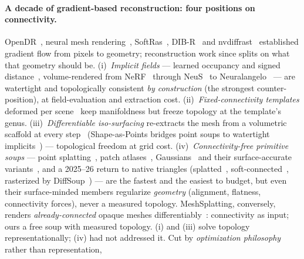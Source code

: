 \paragraph{A decade of gradient-based reconstruction: four positions on
connectivity.}
OpenDR~\citep{loper2014opendr}, neural mesh
rendering~\citep{kato2018neural}, SoftRas~\citep{liu2019softras},
DIB-R~\citep{chen2019dibr} and nvdiffrast~\citep{laine2020nvdiffrast}
established gradient flow from pixels to geometry; reconstruction work
since splits on what that geometry should be.
(i)~\emph{Implicit fields} --- learned occupancy and signed
distance~\citep{mescheder2019occupancy,park2019deepsdf}, volume-rendered
from NeRF~\citep{mildenhall2020nerf} through NeuS~\citep{wang2021neus} to
Neuralangelo~\citep{li2023neuralangelo} --- are watertight and
topologically consistent \emph{by construction} (the strongest
counter-position), at field-evaluation and extraction cost.
(ii)~\emph{Fixed-connectivity templates} deformed per
scene~\citep{wang2018pixel2mesh,hanocka2020point2mesh} keep manifoldness
but freeze topology at the template's genus.
(iii)~\emph{Differentiable iso-surfacing} re-extracts the mesh from a
volumetric scaffold at every
step~\citep{shen2021dmtet,munkberg2022nvdiffrec,shen2023flexicubes}
(Shape-as-Points bridges point soups to watertight
implicits~\citep{peng2021sap}) --- topological freedom at grid cost.
(iv)~\emph{Connectivity-free primitive soups} --- point
splatting~\citep{yifan2019dss}, patch atlases~\citep{groueix2018atlasnet},
Gaussians~\citep{kerbl2023gaussians} and their surface-accurate
variants~\citep{huang20242dgs,guedon2024sugar}, and a 2025--26 return to
native triangles (splatted~\citep{held2025trianglesplatting},
soft-connected~\citep{burgdorfer2025radiant}, rasterized by
DiffSoup~\citep{tojo2026diffsoup}) --- are the fastest and the easiest
to budget, but even their surface-minded members regularize
\emph{geometry} (alignment, flatness, connectivity forces), never a
measured topology.
MeshSplatting, conversely, renders \emph{already-connected} opaque
meshes differentiably~\citep{held2026meshsplatting}: connectivity as
input; ours a free soup with measured topology.
(i) and (iii) solve topology representationally; (iv) had not addressed
it. Cut by \emph{optimization philosophy} rather than representation,
